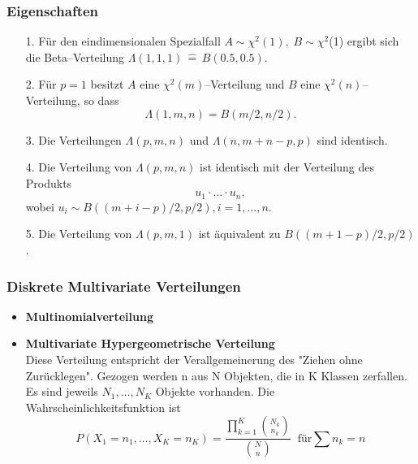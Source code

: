 \begin{frame}\frametitle{Eigenschaften}
\begin{enumerate}
\item [1.] F\"{u}r den eindimensionalen Spezialfall $A\sim
\chi^2(1),\;B\sim\chi^2$(1) ergibt sich die Beta--Verteilung
$\Lambda(1, 1, 1)\,{\hat =}\,B(0.5, 0.5)$.
\item [2.] F\"{u}r $p=1$ besitzt $A$ eine $\chi^2(m)$--Verteilung und
$B$ eine $\chi^2(n)$--Verteilung, so dass
\[
\Lambda(1, m, n)=B(m/2, n/2).
\]
\item [3.] Die Verteilungen $\Lambda(p, m, n)$ und $\Lambda(n, m+n-p, p)$ sind identisch.
\item [4.] Die Verteilung von $\Lambda(p, m, n)$ ist identisch mit der Verteilung des Produkts
\[
u_1\cdot\ldots\cdot u_n,
\]
wobei $u_i\sim B((m+i-p)/2, p/2), i=1, \ldots, n$.
\item [5.] Die Verteilung von $\Lambda(p,m,1)$ ist \"{a}quivalent zu $B((m+1-p)/2, p/2)$.
\end{enumerate}
\end{frame}


\begin{frame}\frametitle{Diskrete Multivariate
Verteilungen}

\begin{itemize}
\item {\bf Multinomialverteilung}
\item {\bf Multivariate Hypergeometrische Verteilung} \\
Diese Verteilung entspricht der Verallgemeinerung des "Ziehen ohne
Zur\"{u}cklegen". Gezogen werden n  aus N Objekten, die in K Klassen
zerfallen. Es sind jeweils $N_1,\ldots,N_K$ Objekte vorhanden. Die
Wahrscheinlichkeitsfunktion ist
$$ P(X_1=n_1,\ldots,X_K=n_K) = \frac {\prod_{k=1}^K {N_k \choose
n_k}}{{N\choose n}} \;\;\mbox{f\"{u}r} \sum n_k = n
$$
\end{itemize}
\end{frame}

